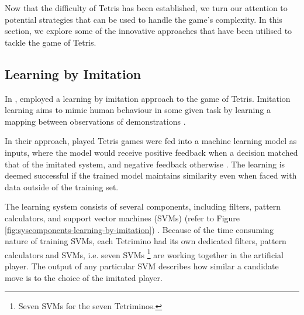 \documentclass[a4paper, 12pt]{extreport}
\begin{document}
			
			Now that the difficulty of Tetris has been established, we turn our attention to potential strategies that can be used to handle the game's complexity. In this section, we explore some of the innovative approaches that have been utilised to tackle the game of Tetris.
			
			\subsection{Learning by Imitation} \label{subsec:imit-learning}
			
				In \citeyear{tetris-learning-by-imitation}, \citeauthor{tetris-learning-by-imitation} \cite{tetris-learning-by-imitation} employed a learning by imitation approach to the game of Tetris. Imitation learning aims to mimic human behaviour in some given task by learning a mapping between observations of demonstrations \cite{imitation-learning}.
				
				In their approach, played Tetris games were fed into a machine learning model as inputs, where the model would receive positive feedback when a decision matched that of the imitated system, and negative feedback otherwise \cite{tetris-learning-by-imitation}. The learning is deemed successful if the trained model maintains similarity even when faced with data outside of the training set.
				
				The learning system consists of several components, including filters, pattern calculators, and support vector machines (SVMs) (refer to Figure \ref{fig:syscomponents-learning-by-imitation}) \cite{tetris-learning-by-imitation}. Because of the time consuming nature of training SVMs, each Tetrimino had its own dedicated filters, pattern calculators and SVMs, i.e. seven SVMs \footnote{Seven SVMs for the seven Tetriminos.} are working together in the artificial player. The output of any particular SVM describes how similar a candidate move is to the choice of the imitated player.
				
\end{document}
